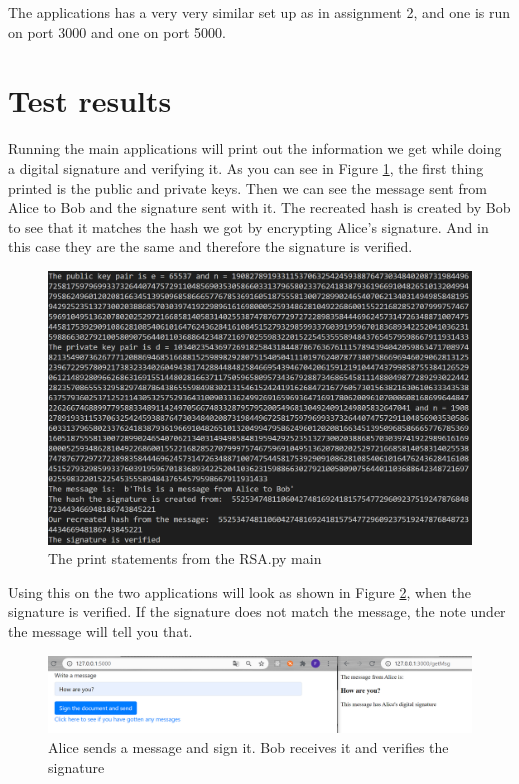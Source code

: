 \documentclass[12pt, letterpaper]{article}
\begin{document}
The applications has a very very similar set up as in assignment 2, and one is run on port 3000 and one on port 5000. 

\section*{Test results}

Running the main applications will print out the information we get while doing a digital signature and verifying it. As you can see in Figure \ref{fig:print}, the first thing printed is the public and private keys. Then we can see the message sent from Alice to Bob and the signature sent with it. The recreated hash is created by Bob to see that it matches the hash we got by encrypting Alice's signature. And in this case they are the same and therefore the signature is verified.

\begin{figure}[H]
  \includegraphics[width=\linewidth]{code_snippets/print.PNG}\centering
  \caption{The print statements from the RSA.py main}
  \label{fig:print}
\end{figure}

Using this on the two applications will look as shown in Figure \ref{fig:msg}, when the signature is verified. If the signature does not match the message, the note under the message will tell you that.

\begin{figure}[H]
  \hspace*{-50px}\includegraphics[width=500px]{code_snippets/msg.PNG}\centering
  \caption{Alice sends a message and sign it. Bob receives it and verifies the signature}
  \label{fig:msg}
\end{figure}
\end{document}
